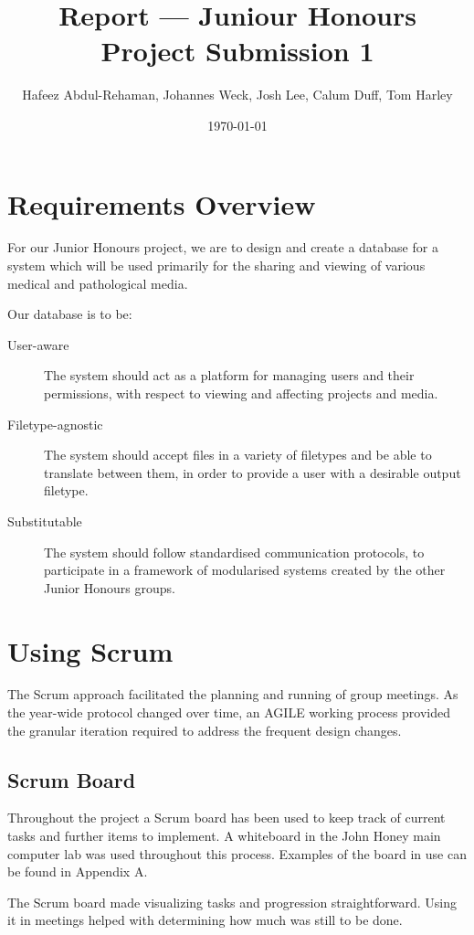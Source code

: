 \documentclass{article}
\begin{document}
\title{Report --- Juniour Honours Project Submission 1}
\author{Hafeez Abdul-Rehaman, Johannes Weck, Josh Lee, Calum Duff, Tom Harley}
\date{\today}

\maketitle

\section{Requirements Overview}
For our Junior Honours project, we are to design and create a database
for a system which will be used primarily for the sharing and viewing
of various medical and pathological media.

Our database is to be:
\begin{description}
  \item[User-aware] The system should act as a platform for managing
    users and their permissions, with respect to viewing and affecting
    projects and media.
  \item[Filetype-agnostic] The system should accept files in a
    variety of filetypes and be able to translate between them, in order to
    provide a user with a desirable output filetype.
  \item[Substitutable] The system should follow standardised
    communication protocols, to participate in a framework of modularised
    systems created by the other Junior Honours groups.
\end{description}

\section{Using Scrum}
The Scrum approach facilitated the
planning and running of group meetings. As the year-wide protocol changed
over time, an AGILE working process provided the granular iteration
required to address the frequent design changes.

\subsection{Scrum Board}
Throughout the project a Scrum board has been used to keep track of current tasks
and further items to implement. A whiteboard in the John Honey main computer lab
was used throughout this process. Examples of the board in use can be found in
Appendix A.

The Scrum board made visualizing tasks and progression straightforward.
Using it in meetings helped with determining how much was still to be done.
\end{document}
